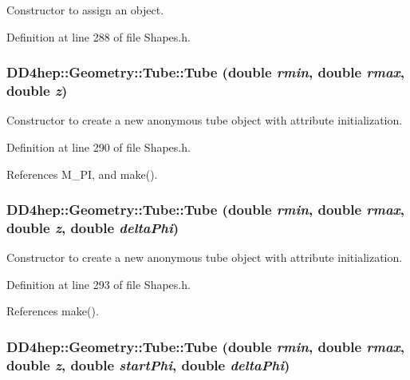 Constructor to assign an object. 

Definition at line 288 of file Shapes.h.\hypertarget{class_d_d4hep_1_1_geometry_1_1_tube_a8c7646c72431590ee08498dccd5db2cf}{
\subsubsection[{Tube}]{\setlength{\rightskip}{0pt plus 5cm}DD4hep::Geometry::Tube::Tube (double {\em rmin}, \/  double {\em rmax}, \/  double {\em z})}}
\label{class_d_d4hep_1_1_geometry_1_1_tube_a8c7646c72431590ee08498dccd5db2cf}


Constructor to create a new anonymous tube object with attribute initialization. 

Definition at line 290 of file Shapes.h.

References M\_\-PI, and make().\hypertarget{class_d_d4hep_1_1_geometry_1_1_tube_a27440d0dd4318c664ff4f3c4a36dd4f0}{
\subsubsection[{Tube}]{\setlength{\rightskip}{0pt plus 5cm}DD4hep::Geometry::Tube::Tube (double {\em rmin}, \/  double {\em rmax}, \/  double {\em z}, \/  double {\em deltaPhi})}}
\label{class_d_d4hep_1_1_geometry_1_1_tube_a27440d0dd4318c664ff4f3c4a36dd4f0}


Constructor to create a new anonymous tube object with attribute initialization. 

Definition at line 293 of file Shapes.h.

References make().\hypertarget{class_d_d4hep_1_1_geometry_1_1_tube_a438240ff1fcab0e3e737c57d0e042fc6}{
\subsubsection[{Tube}]{\setlength{\rightskip}{0pt plus 5cm}DD4hep::Geometry::Tube::Tube (double {\em rmin}, \/  double {\em rmax}, \/  double {\em z}, \/  double {\em startPhi}, \/  double {\em deltaPhi})}}
\label{class_d_d4hep_1_1_geometry_1_1_tube_a438240ff1fcab0e3e737c57d0e042fc6}


